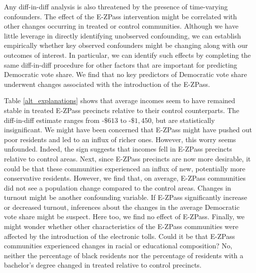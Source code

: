
Any diff-in-diff analysis is also threatened by the presence of time-varying confounders. The effect of the E-ZPass intervention might be correlated with other changes occurring in treated or control communities. Although we have little leverage in directly identifying unobserved confounding, we can establish empirically whether key observed confounders might be changing along with our outcomes of interest. In particular, we can identify such effects by completing the same diff-in-diff procedure for other factors that are important for predicting Democratic vote share. We find that no key predictors of Democratic vote share underwent changes associated with the introduction of the E-ZPass. 

Table \ref{alt_explanations} shows that average incomes seem to have remained stable in treated E-ZPass precincts relative to their control counterparts. The diff-in-diff estimate ranges from -$\$613$ to -$\$1,450$, but are statistically insignificant. We might have been concerned that E-ZPass might have pushed out poor residents and led to an influx of richer ones. However, this worry seems unfounded. Indeed, the sign suggests that incomes fell in E-ZPass precincts relative to control areas. Next, since E-ZPass precincts are now more desirable, it could be that these communities experienced an influx of new, potentially more conservative residents. However, we find that, on average, E-ZPass communities did not see a population change compared to the control areas. Changes in turnout might be another confounding variable. If E-ZPass significantly increase or decreased turnout, inferences about the changes in the average Democratic vote share might be suspect. Here too, we find no effect of E-ZPass. Finally, we might wonder whether other characteristics of the E-ZPass communities were affected by the introduction of the electronic tolls. Could it be that E-ZPass communities experienced changes in racial or educational composition? No, neither the percentage of black residents nor the percentage of residents with a bachelor's degree changed in treated relative to control precincts. 

